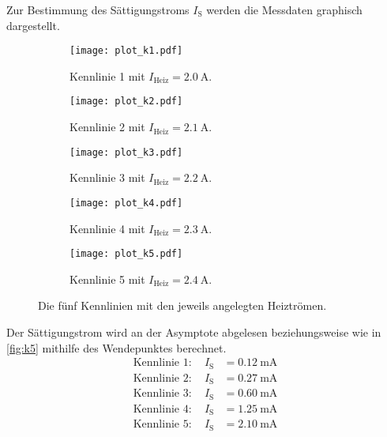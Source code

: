 Zur Bestimmung des Sättigungstroms $I_{\text{S}}$ werden die Messdaten graphisch dargestellt.
\begin{figure}
  \centering
  
  \begin{subfigure}{0.49\columnwidth}
  \centering
  \texttt{[image: plot\_k1.pdf]}
  \caption{Kennlinie 1 mit $I_\text{Heiz} = \qty{2,0}{\ampere}$.}
  \label{fig:k1}
  \end{subfigure}\hfill
  \begin{subfigure}{0.49\columnwidth}
  \centering
  \texttt{[image: plot\_k2.pdf]}
  \caption{Kennlinie 2 mit $I_\text{Heiz} = \qty{2,1}{\ampere}$.}
  \label{fig:k2}
  \end{subfigure}
  
  \medskip
  
  \begin{subfigure}{0.49\columnwidth}
  \centering
  \texttt{[image: plot\_k3.pdf]}
  \caption{Kennlinie 3 mit $I_\text{Heiz} = \qty{2,2}{\ampere}$.}
  \label{fig:k3}
  \end{subfigure}\hfill
  \begin{subfigure}{0.49\columnwidth}
  \centering
  \texttt{[image: plot\_k4.pdf]}
  \caption{Kennlinie 4 mit $I_\text{Heiz} = \qty{2,3}{\ampere}$.}
  \label{fig:k4}
  \end{subfigure}
  
  \medskip
  
  \begin{subfigure}{0.49\columnwidth}
  \centering
  \texttt{[image: plot\_k5.pdf]}
  \caption{Kennlinie 5 mit $I_\text{Heiz} = \qty{2,4}{\ampere}$.}
  \label{fig:k5}
  \end{subfigure}
  
  \caption{Die fünf Kennlinien mit den jeweils angelegten Heiztrömen.}
  \label{fig:k}
\end{figure}

Der Sättigungstrom wird an der Asymptote abgelesen beziehungsweise wie in \autoref{fig:k5} 
mithilfe des Wendepunktes berechnet.
\begin{align*}
  \text{Kennlinie 1} : \quad I_\text{S} &= \qty{0,12}{\milli\ampere} \\
  \text{Kennlinie 2} : \quad I_\text{S} &= \qty{0,27}{\milli\ampere} \\
  \text{Kennlinie 3} : \quad I_\text{S} &= \qty{0,60}{\milli\ampere} \\
  \text{Kennlinie 4} : \quad I_\text{S} &= \qty{1,25}{\milli\ampere} \\
  \text{Kennlinie 5} : \quad I_\text{S} &= \qty{2,10}{\milli\ampere}
\end{align*}

